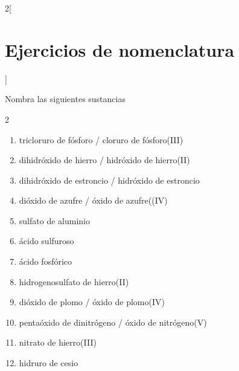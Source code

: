 \documentclass[10pt]{article}
\begin{document}
\begin{multicols*}{2}[
  \section{Ejercicios de nomenclatura}
  ]

\begin{exercise}[
    tags    = {inorgánica,nomenclatura,múltiple,2B},
    topics  = {química inorgánica,formulación,nomenclatura},
    source  = {Química 2B SAN 2016, p372, e6},
  ]
  Nombra las siguientes sustancias

  \begin{enumerate}\begin{multicols}{2}
    \item {}
    \item {}
    \item {}
    \item {}
    \item {}
    \item {}
    \item {}
    \item {}
    \item {}
    \item {}
    \item {}
    \item {}
  \end{multicols}\end{enumerate}
\end{exercise}

\begin{solution}
  \begin{enumerate}
    \item tricloruro de fósforo / cloruro de fósforo(III)
    \item dihidróxido de hierro / hidróxido de hierro(II)
    \item dihidróxido de estroncio / hidróxido de estroncio
    \item dióxido de azufre / óxido de azufre((IV)
    \item sulfato de aluminio
    \item ácido sulfuroso
    \item ácido fosfórico
    \item hidrogenosulfato de hierro(II)
    \item dióxido de plomo / óxido de plomo(IV)
    \item pentaóxido de dinitrógeno / óxido de nitrógeno(V)
    \item nitrato de hierro(III)
    \item hidruro de cesio
  \end{enumerate}
\end{solution}





\end{multicols*}
\end{document}
